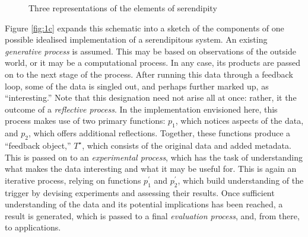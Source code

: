 \afterpage{\clearpage}
\begin{figure}[p]
\begin{minipage}[b]{\textwidth}
{\centering


\par}
\vspace{-4mm}
\label{fig:1a}
\end{minipage}
\medskip

\begin{minipage}[b]{\textwidth}
{\centering

\par}
\label{fig:1b}
\end{minipage}
\medskip

\begin{minipage}[b]{\textwidth}
{\centering


\par}
\smallskip

\label{fig:1c}
\end{minipage}
\bigskip

\caption{Three representations of the elements of serendipity}\label{fig:model}
\end{figure}

Figure \ref{fig:1c} expands this schematic into a sketch of the
components of one possible idealised implementation of a serendipitous
system.  An existing \emph{generative process} is assumed.  This may
be based on observations of the outside world, or it may be a
computational process.  In any case, its products are passed on to the
next stage of the process.  After running this data through a feedback
loop, some of the data is singled out, and perhaps further marked up,
as ``interesting.''  Note that this designation need not arise all at
once: rather, it the outcome of a \emph{reflective process}.  In the
implementation envisioned here, this process makes use of two primary
functions: $p_1$, which notices aspects of the data, and $p_2$, which
offers additional reflections.  Together, these functions produce a
``feedback object,'' $T^{\star}$, which consists of the original data
and added metadata.  This is passed on to an \emph{experimental
  process}, which has the task of understanding what makes the data
interesting and what it may be useful for.  This is again an iterative
process, relying on functions $p^{\prime}_1$ and $p^{\prime}_2$,
which build understanding of the trigger by devising experiments and
assessing their results.  Once sufficient understanding of the data and its potential
implications has been reached, a result is generated, which is passed
to a final \emph{evaluation process}, and, from there, to
applications.

